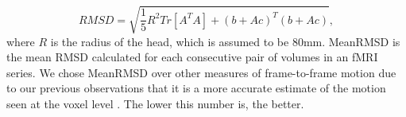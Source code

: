 \documentclass{frontiersSCNS} %
\begin{document}
\begin{equation}
    RMSD = \sqrt{\frac{1}{5}R^2Tr[A^{T}A]+(b+Ac)^T(b+Ac)},
\end{equation}
where $R$ is the radius of the head, which is assumed to be 80mm. MeanRMSD is the mean RMSD calculated for each consecutive pair of volumes in an fMRI series. We chose MeanRMSD over other measures of frame-to-frame motion \citep[e.g.][]{power2012,VanDijk2012} due to our previous observations that it is a more accurate estimate of the motion seen at the voxel level \citep{Yan2013}. The lower this number is, the better.
\end{document}
